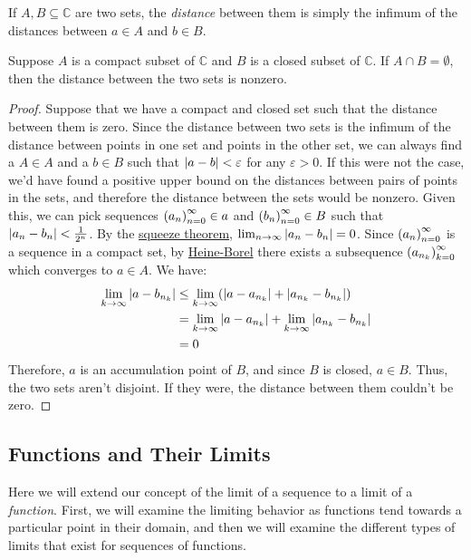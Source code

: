 \begin{definition}
If $A, B \subseteq \mathbb{C}$ are two sets, the \emph{distance} between them is simply the infimum of the distances between $a \in A$ and $b \in B$.
\end{definition}
\begin{theorem}
Suppose $A$ is a compact subset of $\mathbb{C}$ and $B$ is a closed subset of $\mathbb{C}$. If $A \cap B = \emptyset$, then the distance between the two sets is nonzero.
\end{theorem}
\begin{proof}
Suppose that we have a compact and closed set such that the distance between them is zero. Since the distance between two sets is the infimum of the distance between points in one set and points in the other set, we can always find a $A \in A$ and a $b \in B$ such that $\left\lvert a-b \right\rvert < \varepsilon$ for any $\varepsilon > 0$. If this were not the case, we'd have found a positive upper bound on the distances between pairs of points in the sets, and therefore the distance between the sets would be nonzero. Given this, we can pick sequences $\seq{a} \in a$ and $\seq{b} \in B$ such that $\left\lvert a_n - b_n \right\rvert < \frac{1}{2^n}$. By the \hyperlink{Squeeze Theorem}{squeeze theorem}, $\lim_{n\to\infty}\left\lvert a_n -b_n \right\rvert = 0$. Since $\seq{a}$ is a sequence in a compact set, by \hyperlink{Heine-Borel Theorem}{Heine-Borel} there exists a subsequence $\seq{a}[n_k][k]$ which converges to $a \in A$. We have:
\begin{align*}
\lim_{k\to\infty}\left\lvert a-b_{n_k} \right\rvert &\leq \lim_{k\to\infty}(\left\lvert a-a_{n_k} \right\rvert + \left\lvert a_{n_k} - b_{n_k} \right\rvert)\\
&= \lim_{k\to\infty}\left\lvert a-a_{n_k} \right\rvert + \lim_{k\to\infty}\left\lvert a_{n_k}-b_{n_k} \right\rvert\\
&= 0
\end{align*}
Therefore, $a$ is an accumulation point of $B$, and since $B$ is closed, $a\in B$. Thus, the two sets aren't disjoint. If they were, the distance between them couldn't be zero.
\end{proof}
\subsection{Functions and Their Limits}
Here we will extend our concept of the limit of a sequence to a limit of a \emph{function}. First, we will examine the limiting behavior as functions tend towards a particular point in their domain, and then we will examine the different types of limits that exist for sequences of functions.
